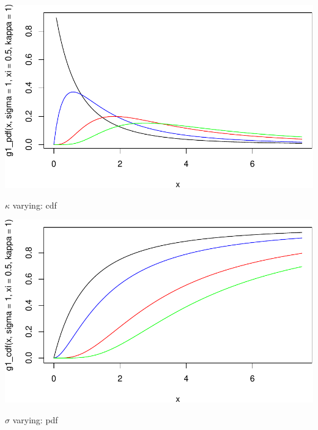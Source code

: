 \documentclass[
]{article}
\begin{document}
\begin{center}\includegraphics[width=0.8\linewidth]{g1_varying_params_files/figure-latex/unnamed-chunk-2-1} \end{center}

\(\kappa\) varying: cdf

\begin{center}\includegraphics[width=0.8\linewidth]{g1_varying_params_files/figure-latex/unnamed-chunk-3-1} \end{center}
\pagebreak

\(\sigma\) varying: pdf
\end{document}
